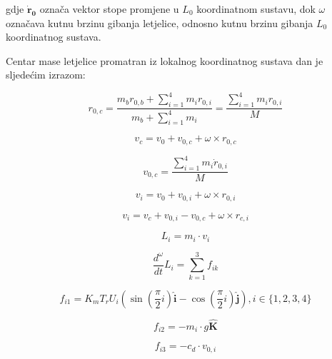 \documentclass[11pt,a4paper]{article}
\begin{document}
gdje $\boldsymbol{\dot{r}_{0}}$ označa vektor stope promjene u $L_{0}$ koordinatnom sustavu, dok $\omega$  označava kutnu brzinu gibanja letjelice, odnosno kutnu brzinu gibanja $L_{0}$ koordinatnog sustava. 

\medskip

Centar mase letjelice promatran iz lokalnog koordinatnog sustava dan je sljedećim izrazom:

\begin{equation}
 {r}_{0,c} = \frac{ {m}_{b} {r}_{0,b} + \sum_{i=1}^{4}{m}_{i} {r}_{0,i}}{{m}_{b} + \sum_{i=1}^{4} {m}_{i}} = \frac{\sum_{i=1}^{4} {m}_{i} {r}_{0,i}}{ {M}}
\label{eq:r0c}
\end{equation}

\begin{equation}
 {v_{c} = v_{0} + v_{0,c} + \omega \times r_{0,c}}
\label{eq:vc}
\end{equation}

\begin{equation}
 {v_{0,c} = \frac{\sum_{i=1}^{4}m_{i}\dot{r}_{0,i}}{M}}
\label{eq:v0c}
\end{equation}

\begin{equation}
 {v_{i} = v_{0} + v_{0,i} + \omega \times r_{0,i}}
\label{eq:vi}
\end{equation}

\begin{equation}
 {v_{i} = v_{c} + v_{0,i} - v_{0,c} + \omega \times r_{c,i}}
\label{eq:vi2}
\end{equation}

\begin{equation}
 {L_{i} = m_{i} \cdot v_{i}}
\label{eq:Li}
\end{equation}

\begin{equation}
 {\frac{d^{\omega}}{dt} L_{i} = \sum_{k=1}^{3}f_{ik}}
\label{eq:Lidot}
\end{equation}

\begin{equation}
f_{i1}  =K_{m}T_{r}U_{i}\left(\sin\left(\frac{\pi}{2}i\right) \bm{\hat{i}} - \cos\left( \frac{\pi}{2}i\right) \bm{\hat{j}}\right), i \in \{1,2,3,4\}
\label{eq:fi1}
\end{equation}

\begin{equation}
f_{i2} = -m_{i}\cdot g \bm{\hat{K}}
\label{eq:fi2}
\end{equation}

\begin{equation}
f_{i3} = -c_{d} \cdot v_{0,i}
\label{eq:fi3}
\end{equation}
\end{document}

